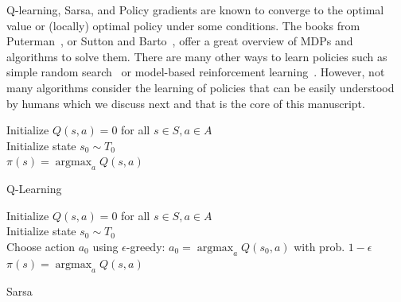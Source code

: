 Q-learning, Sarsa, and Policy gradients are known to converge to the optimal value or (locally) optimal policy under some conditions.
The books from Puterman~\cite{puterman}, or Sutton and Barto~\cite{sutton}, offer a great overview of MDPs and algorithms to solve them.
There are many other ways to learn policies such as simple random search~\cite{random-search} or model-based reinforcement learning~\cite{dyna}. 
However, not many algorithms consider the learning of policies that can be easily understood by humans which we discuss next and that is the core of this manuscript.

\begin{algorithm}
    Initialize $Q(s,a) = 0$ for all $s \in S, a \in A$ \\
    Initialize state $s_0 \sim T_0$ \\
    $\pi(s) = \operatorname{argmax}_a Q(s,a)$ 
    \caption{Q-Learning}\label{alg:qlearning}
\end{algorithm}


\begin{algorithm}
    Initialize $Q(s,a) = 0$ for all $s \in S, a \in A$ \\
    Initialize state $s_0 \sim T_0$ \\
    Choose action $a_0$ using $\epsilon$-greedy: $a_0 = \operatorname{argmax}_a Q(s_0,a)$ with prob. $1-\epsilon$ \\
    $\pi(s) = \operatorname{argmax}_a Q(s,a)$ 
    \caption{Sarsa}\label{alg:sarsa}
\end{algorithm}


